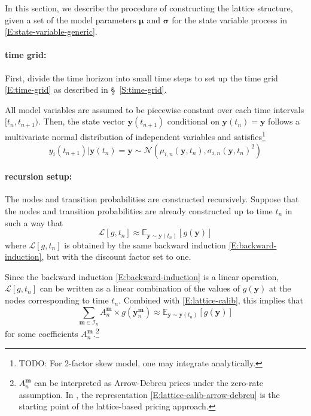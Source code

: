 \documentclass{texyise}
\newcommand{\indexset}{\mathcal{I}}
\newcommand{\valuebackwardnodisc}{\mathcal{L}}
\begin{document}
In this section, we describe the procedure of constructing the lattice structure, given a set of the model parameters $\bm{\mu}$ and $\bm{\sigma}$ for the state variable process in \eqref{E:state-variable-generic}.

\paragraph*{time grid:}

First, divide the time horizon into small time steps to set up the time grid \eqref{E:time-grid} as described in \S~\ref{S:time-grid}. 

All model variables are assumed to be piecewise constant over each time intervals $[t_n, t_{n+1})$. Then, the state vector $\bm{y}(t_{n+1})$ conditional on $\bm{y}(t_n) = \bm{y}$ follows a multivariate normal distribution of independent variables and satisfies\footnote{TODO: For 2-factor skew model, one may integrate analytically.}
\begin{equation}
    y_i(t_{n+1}) | \bm{y}(t_n) = \bm{y}  \sim \mathcal{N}(\mu_{i,n}(\bm{y},t_n), \sigma_{i,n}(\bm{y},t_n)^2)
    \label{E:conditional-distribution}
\end{equation}

\paragraph*{recursion setup:}

The nodes and transition probabilities are constructed recursively. Suppose that the nodes and transition probabilities are already constructed up to time $t_n$ in such a way that 
\begin{equation}
    \valuebackwardnodisc[g, t_n] \approx \mathbb{E}_{\bm{y}\sim\bm{y}(t_n)}\left[ g(\bm{y}) \right] 
    \label{E:lattice-calib}
\end{equation}
where $\valuebackwardnodisc[g, t_n]$ is obtained by the same backward induction \eqref{E:backward-induction}, but with the discount factor set to one. 

Since the backward induction \eqref{E:backward-induction} is a linear operation, 
$\valuebackwardnodisc[g, t_n]$ can be written as a linear combination of the values of $g(\bm{y})$ at the nodes corresponding to time $t_n$. Combined with \eqref{E:lattice-calib}, this implies that
\begin{equation}
\sum_{\bm{m} \in \indexset_n} A_{n}^{\bm{m}} \times g(\bm{y}_n^{\bm{m}}) \approx \mathbb{E}_{\bm{y}\sim \bm{y}(t_n)}\left[ g(\bm{y}) \right] 
\label{E:lattice-calib-arrow-debreu}
\end{equation}
for some coefficients $A_{n}^{\bm{m}}$.\footnote{$A_{n}^{\bm{m}}$ can be interpreted as Arrow-Debreu prices under the zero-rate assumption. In \cite{2fs-citi-mv}, the representation \eqref{E:lattice-calib-arrow-debreu}
is the starting point of the lattice-based pricing approach.}
\end{document}

